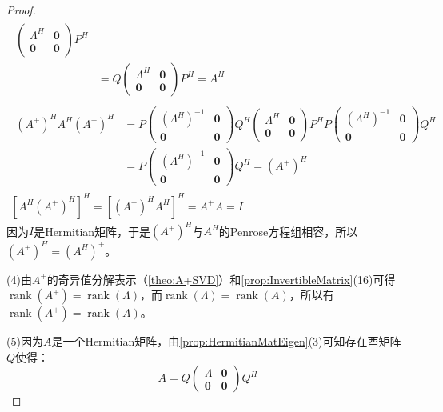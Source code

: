 \begin{proof}
\begin{gather*}
\begin{aligned}
\begin{pmatrix}
				\varLambda^H & \mathbf{0} \\
				\mathbf{0} & \mathbf{0}
			\end{pmatrix}
			P^H \\
			&=Q
			\begin{pmatrix}
				\varLambda^H & \mathbf{0} \\
				\mathbf{0} & \mathbf{0}
			\end{pmatrix}
			P^H
			=A^H
		\end{aligned} \\
		\begin{aligned}
			(A^+)^HA^H(A^+)^H
			&=P
			\begin{pmatrix}
				(\varLambda^H)^{-1} & \mathbf{0} \\
				\mathbf{0} & \mathbf{0}
			\end{pmatrix}
			Q^H\begin{pmatrix}
				\varLambda^H & \mathbf{0} \\
				\mathbf{0} & \mathbf{0}
			\end{pmatrix}
			P^HP
			\begin{pmatrix}
				(\varLambda^H)^{-1} & \mathbf{0} \\
				\mathbf{0} & \mathbf{0}
			\end{pmatrix}Q^H \\
			&=P
			\begin{pmatrix}
				(\varLambda^H)^{-1} & \mathbf{0} \\
				\mathbf{0} & \mathbf{0}
			\end{pmatrix}Q^H
			=(A^+)^H
		\end{aligned} \\
		[A^H(A^+)^H]^H=[(A^+)^HA^H]^H=A^+A=I
	\end{gather*}
	因为$I$是Hermitian矩阵，于是$(A^+)^H$与$A^H$的Penrose方程组相容，所以$(A^+)^H=(A^H)^+$。\par
	(4)由$A^+$的奇异值分解表示（\cref{theo:A+SVD}）和\cref{prop:InvertibleMatrix}(16)可得$\operatorname{rank}(A^+)=\operatorname{rank}(\varLambda)$，而$\operatorname{rank}(\varLambda)=\operatorname{rank}(A)$，所以有$\operatorname{rank}(A^+)=\operatorname{rank}(A)$。\par
	(5)因为$A$是一个Hermitian矩阵，由\cref{prop:HermitianMatEigen}(3)可知存在酉矩阵$Q$使得：
	\begin{equation*}
		A=Q
		\begin{pmatrix}
			\varLambda & \mathbf{0} \\
			\mathbf{0} & \mathbf{0}
		\end{pmatrix}Q^H

\end{equation*}
\end{proof}
